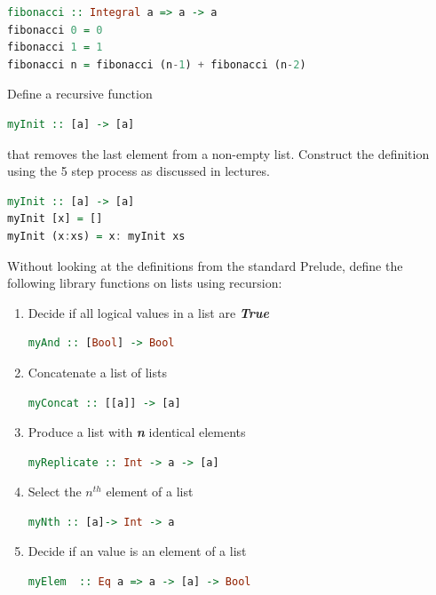 \documentclass{article}
\begin{document}
\begin{solution}
\begin{lstlisting}[language=Haskell]
fibonacci :: Integral a => a -> a 
fibonacci 0 = 0
fibonacci 1 = 1
fibonacci n = fibonacci (n-1) + fibonacci (n-2) 
\end{lstlisting}
\end{solution}

\begin{exercise}

Define a recursive function \\
\begin{lstlisting}[language=Haskell]
myInit :: [a] -> [a]
\end{lstlisting}
that removes the last element from a non-empty list. Construct the definition using the 5 step process as discussed in lectures.

\end{exercise}

\begin{solution}
\begin{lstlisting}[language=Haskell]
myInit :: [a] -> [a]
myInit [x] = []
myInit (x:xs) = x: myInit xs
\end{lstlisting}
\end{solution}
\pagebreak
\begin{exercise}
Without looking at the definitions from the standard Prelude, define the following library functions on lists using recursion: 
\begin{enumerate}
	\item Decide if all logical values in a list are \textbf{\textit{True}}
	\begin{lstlisting}[language=Haskell]
myAnd :: [Bool] -> Bool
	\end{lstlisting}
	\item Concatenate a list of lists
\begin{lstlisting}[language=Haskell]
myConcat :: [[a]] -> [a]
\end{lstlisting}
	\item Produce a list with \textbf{\textit{n}} identical elements
\begin{lstlisting}[language=Haskell]
myReplicate :: Int -> a -> [a]
\end{lstlisting}
	\item Select the $n^{th}$ element of a list
\begin{lstlisting}[language=Haskell]
myNth :: [a]-> Int -> a
\end{lstlisting}
	\item Decide if an value is an element of a list
\begin{lstlisting}[language=Haskell]
myElem  :: Eq a => a -> [a] -> Bool
\end{lstlisting}
 \end{enumerate}
\end{exercise}
\end{document}
